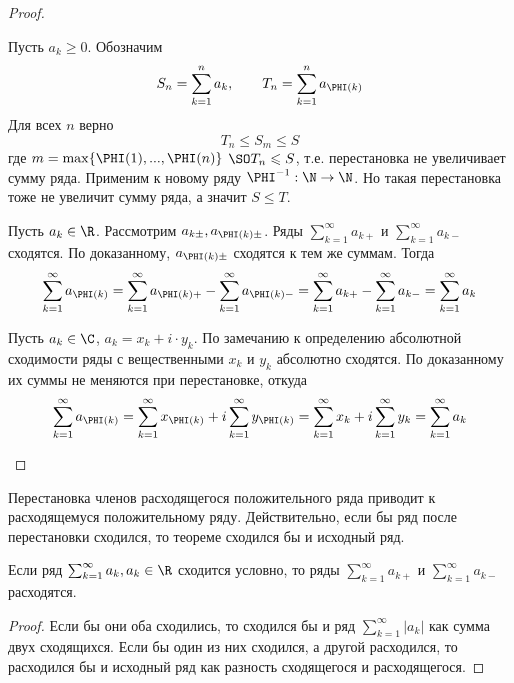 \begin{proof}
	\begin{MyList}
		\item Пусть $a_k \geqslant 0$. Обозначим
		\[S_n = \sum_{k=1}^{n} a_k, \qquad T_n = \sum_{k=1}^{n} a_{\PHI(k)}\]
		Для всех $n$ верно
		\[T_n \leqslant S_m \leqslant S\]
		где $m = \max \{\PHI(1), ..., \PHI(n)\}$ $\SO T_n \leqslant S$, т.е. перестановка не увеличивает сумму ряда.  
		Применим к новому ряду $\PHI^{-1} : \N \to \N$. Но такая перестановка тоже не увеличит сумму ряда, а значит $S \leqslant T$.

		\item Пусть $a_k \in \R$. Рассмотрим $a_{k\pm}, a_{\PHI(k)\pm}$. 
		Ряды $\sum_{k=1}^{\infty} a_{k+}$ и $\sum_{k=1}^{\infty} a_{k-}$ сходятся. По доказанному, $a_{\PHI(k)\pm}$ сходятся к тем же суммам. Тогда
		\[\sum_{k=1}^{\infty} a_{\PHI(k)} = \sum_{k=1}^{\infty} a_{\PHI(k)+} - \sum_{k=1}^{\infty} a_{\PHI(k)-} = \sum_{k=1}^{\infty} a_{k+} - \sum_{k=1}^{\infty} a_{k-} = \sum_{k=1}^{\infty} a_k\]  
		
		\item Пусть $a_k \in \C$, $a_k = x_k + i \cdot y_k$. По замечанию к определению абсолютной сходимости ряды с вещественными $x_k$ и $y_k$ абсолютно сходятся.
		По доказанному их суммы не меняются при перестановке, откуда
		\[\sum_{k=1}^{\infty} a_{\PHI(k)} = \sum_{k=1}^{\infty} x_{\PHI(k)} + i \sum_{k=1}^{\infty} y_{\PHI(k)} = \sum_{k=1}^{\infty} x_k + i \sum_{k=1}^{\infty} y_k = \sum_{k=1}^{\infty} a_k\]
	\end{MyList}
\end{proof}

\begin{Rem}
	Перестановка членов расходящегося положительного ряда приводит к расходящемуся положительному ряду. 
	Действительно, если бы ряд после перестановки сходился, то теореме сходился бы и исходный ряд.
\end{Rem}

\begin{Rem}
	Если ряд $\sum_{k=1}^{\infty} a_k, a_k \in \R$ сходится условно, то ряды $\sum_{k=1}^{\infty} a_{k+}$ и $\sum_{k=1}^{\infty} a_{k-}$ расходятся.   
\end{Rem}

\begin{proof}
	Если бы они оба сходились, то сходился бы и ряд $\sum_{k=1}^{\infty} |a_k|$ как сумма двух сходящихся.
	Если бы один из них сходился, а другой расходился, то расходился бы и исходный ряд как разность сходящегося и расходящегося. 
\end{proof}

